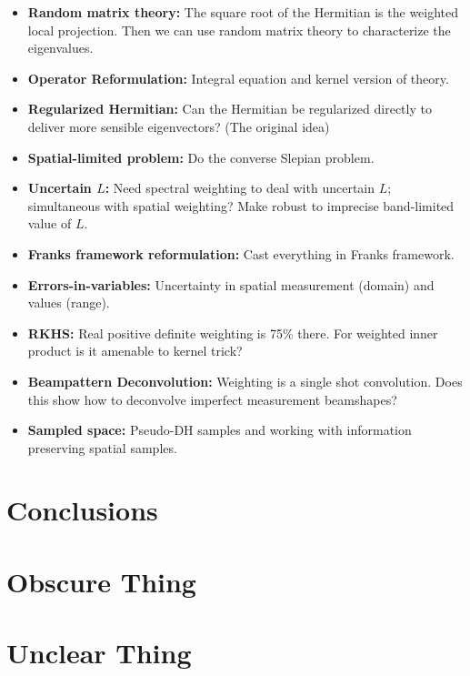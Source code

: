\documentclass[10pt, twocolumn, twoside]{IEEEtran}
\begin{document}
\begin{itemize}
\item \textbf{Random matrix theory:}
The square root of the Hermitian is the weighted local projection.  Then we can use random matrix theory to characterize the eigenvalues.

\item \textbf{Operator Reformulation:}
Integral equation and kernel version of theory.

\item \textbf{Regularized Hermitian:}
Can the Hermitian be regularized directly to deliver more sensible eigenvectors? (The original idea)

\item \textbf{Spatial-limited problem:}
Do the converse Slepian problem.

\item \textbf{Uncertain $L$:}
Need spectral weighting to deal with uncertain $L$; simultaneous with spatial weighting?  Make robust to imprecise band-limited value of $L$.

\item \textbf{Franks framework reformulation:}
Cast everything in Franks framework.

\item \textbf{Errors-in-variables:}
Uncertainty in spatial measurement (domain) and values (range).

\item \textbf{RKHS:}
Real positive definite weighting is 75\% there. For weighted inner product is it amenable to kernel trick?

\item \textbf{Beampattern Deconvolution:}
Weighting is a single shot convolution.  Does this show how to deconvolve imperfect measurement beamshapes?

\item \textbf{Sampled space:}
Pseudo-DH samples and working with information preserving spatial samples.
\end{itemize}

\section{Conclusions}

\lipsum[28]



\appendices

\section{Obscure Thing}

\lipsum[38]

\section{Unclear Thing}

\lipsum[41]
\end{document}
